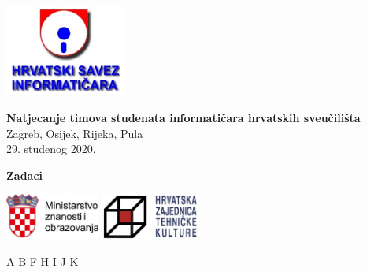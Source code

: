 \documentclass[a4paper]{article}
\begin{document}
\thispagestyle{empty}
\begin{center}
  \includegraphics[height=3cm]{pic/hsin.jpg}
\end{center}
\vspace{1cm}
\begin{center}
  {\Large\textbf{\textsf{Natjecanje timova studenata informatičara hrvatskih sveučilišta}}} \\
  \vspace{.5cm}
  {\large{\textsf{Zagreb, Osijek, Rijeka, Pula}}} \\
  \vspace{.3cm}
  \textsf{29. studenog 2020.}
\end{center}
\vspace{2cm}
\begin{center}
  {\large \textbf{Zadaci}}

  \begin{minipage}{.5\textwidth}
    \renewcommand\contentsname{}
    \tableofcontents
  \end{minipage}
\end{center}
\vspace{5cm}
\begin{center}
  \includegraphics[height=1.5cm]{pic/mzo.jpg}
  \hspace{3cm}
  \includegraphics[height=1.5cm]{pic/hztk.png}
\end{center}
\vspace{\fill}
\clearpage
\setcounter{page}{1}
{A}
{B}
{F}
{H}
{I}
{J}
{K}
\end{document}
